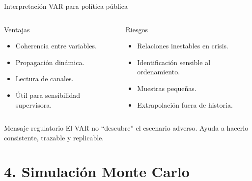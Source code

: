 \documentclass[10pt,aspectratio=169]{beamer}
\begin{document}
\begin{frame}{Interpretación VAR para política pública}
\begin{columns}
\begin{block}{Ventajas}
\begin{itemize}
  \item Coherencia entre variables.
  \item Propagación dinámica.
  \item Lectura de canales.
  \item Útil para sensibilidad supervisora.
\end{itemize}
\end{block}

\begin{block}{Riesgos}
\begin{itemize}
  \item Relaciones inestables en crisis.
  \item Identificación sensible al ordenamiento.
  \item Muestras pequeñas.
  \item Extrapolación fuera de historia.
\end{itemize}
\end{block}
\end{columns}

\vspace{0.4em}
\begin{block}{Mensaje regulatorio}
El VAR no ``descubre'' el escenario adverso. Ayuda a hacerlo consistente, trazable y replicable.
\end{block}
\end{frame}

\section{4. Simulación Monte Carlo}
\end{document}
